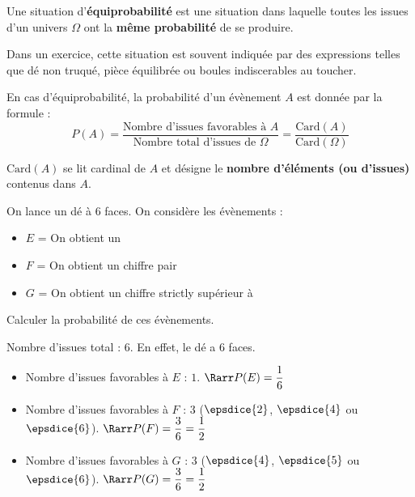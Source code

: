 \begin{definition}[Équiprobabilité]
	Une situation d'\textbf{équiprobabilité} est une situation dans laquelle toutes les issues d'un univers $\Omega$ ont la \textbf{même probabilité} de se produire.

\end{definition}

\begin{rem}Dans un exercice, cette situation est souvent indiquée par des expressions telles que \og{}dé non truqué\fg{}, \og{}pièce équilibrée\fg{} ou \og{}boules indiscerables au toucher\fg{}.\end{rem}

\begin{propriete}
	En cas d'équiprobabilité, la probabilité d'un évènement $A$ est donnée par la formule :
	$$P(A) = \frac{\text{Nombre d'issues favorables à } A}{\text{Nombre total d'issues de } \Omega} = \frac{\text{Card}(A)}{\text{Card}(\Omega)}$$
\end{propriete}

\begin{rem}$\text{Card}(A)$ se lit \og{}cardinal de $A$\fg{} et désigne le \textbf{nombre d'éléments (ou d'issues)} contenus dans $A$.\end{rem}

\begin{methode}
	On lance un dé à 6 faces. On considère les évènements :
	\begin{itemize}
		\item $E$ = \og{}On obtient un \fg{}
		\item $F$ = \og{}On obtient un chiffre pair\fg{}
		\item $G$ = \og{}On obtient un chiffre strictly supérieur à  \fg{}
	\end{itemize}
	Calculer la probabilité de ces évènements.
\end{methode}

\begin{correction}
	Nombre d'issues total : $6$. En effet, le dé a $6$ faces.
	\begin{itemize}
		\item Nombre d'issues favorables à $E$ : $1$. $\Rarr P(E) = \dfrac{1}{6}$
		\item Nombre d'issues favorables à $F$ : $3$ ($\epsdice{2}$, $\epsdice{4}$ ou $\epsdice{6}$). $\Rarr P(F) = \dfrac{3}{6} = \dfrac{1}{2}$
		\item Nombre d'issues favorables à $G$ : $3$ ($\epsdice{4}$, $\epsdice{5}$ ou $\epsdice{6}$). $\Rarr P(G) = \dfrac{3}{6} = \dfrac{1}{2}$
	\end{itemize}
\end{correction}

